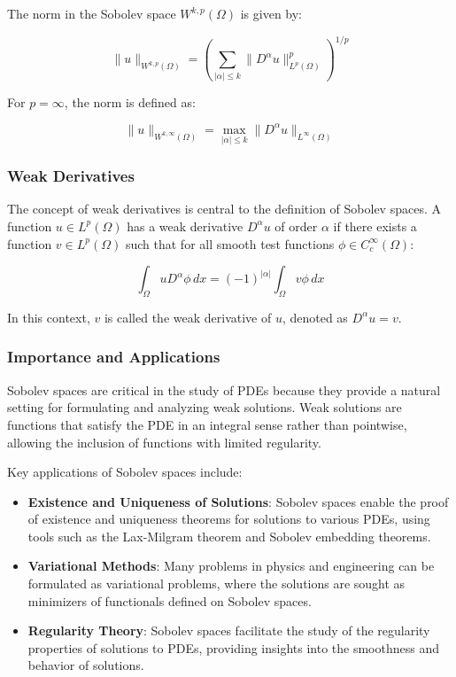 \documentclass[11pt,a4paper]{article}
\begin{document}
The norm in the Sobolev space \( W^{k,p}(\Omega) \) is given by:

\[ \|u\|_{W^{k,p}(\Omega)} = \left( \sum_{|\alpha| \leq k} \|D^\alpha u\|_{L^p(\Omega)}^p \right)^{1/p} \]

For \(p = \infty\), the norm is defined as:

\[ \|u\|_{W^{k,\infty}(\Omega)} = \max_{|\alpha| \leq k} \|D^\alpha u\|_{L^\infty(\Omega)} \]

\subsubsection{Weak Derivatives}

The concept of weak derivatives is central to the definition of Sobolev spaces. A function \(u \in L^p(\Omega)\) has a weak derivative \(D^\alpha u\) of order \(\alpha\) if there exists a function \(v \in L^p(\Omega)\) such that for all smooth test functions \(\phi \in C_c^\infty(\Omega)\):

\[ \int_\Omega u D^\alpha \phi \, dx = (-1)^{|\alpha|} \int_\Omega v \phi \, dx \]

In this context, \(v\) is called the weak derivative of \(u\), denoted as \(D^\alpha u = v\).

\subsubsection{Importance and Applications}

Sobolev spaces are critical in the study of PDEs because they provide a natural setting for formulating and analyzing weak solutions. Weak solutions are functions that satisfy the PDE in an integral sense rather than pointwise, allowing the inclusion of functions with limited regularity.

Key applications of Sobolev spaces include:

\begin{itemize}
    \item \textbf{Existence and Uniqueness of Solutions}: Sobolev spaces enable the proof of existence and uniqueness theorems for solutions to various PDEs, using tools such as the Lax-Milgram theorem and Sobolev embedding theorems.
    \item \textbf{Variational Methods}: Many problems in physics and engineering can be formulated as variational problems, where the solutions are sought as minimizers of functionals defined on Sobolev spaces.
    \item \textbf{Regularity Theory}: Sobolev spaces facilitate the study of the regularity properties of solutions to PDEs, providing insights into the smoothness and behavior of solutions.
\end{itemize}
\end{document}
